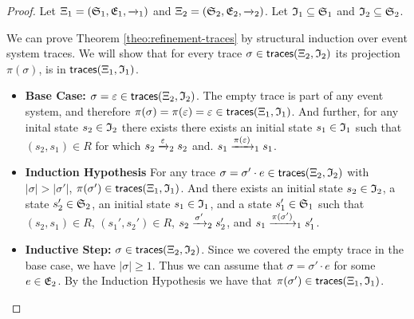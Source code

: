 \begin{proof}
    \label{proof:refinement-traces}
    Let $\EventSystem_1 = (\Statespace_1, \Eventspace_1, \Transitionrelation{1}{})$ and
    $\EventSystem_2 = (\Statespace_2, \Eventspace_2, \Transitionrelation{2}{})$.
    Let $\Initialstates_1 \subseteq \Statespace_1$ and
    $\Initialstates_2 \subseteq \Statespace_2$.

    We can prove Theorem \ref{theo:refinement-traces} by
    structural induction over event system traces.
    We will show that for every trace
    $\sigma \in \EStraces(\EventSystem_2, \Initialstates_2)$
    its projection $\pi(\sigma)$, is in
    $\EStraces(\EventSystem_1, \Initialstates_1)$.
    \begin{itemize}
        \item \textbf{Base Case:}
            $\sigma = \emptytrace \in
            \EStraces(\EventSystem_2, \Initialstates_2)$.
            The empty trace is part of any event system,
            and therefore
            $\pi(\sigma) = \pi(\emptytrace) = \emptytrace 
            \in \EStraces(\EventSystem_1, \Initialstates_1)$.
            And further, for any inital state $s_2 \in \Initialstates_2$ there exists
            there exists an initial state $s_1 \in \Initialstates_1$ such that
            $(s_2, s_1) \in R$
            for which $s_2 \Transitionrelation{2}{\emptytrace} s_2$ and.
            $s_1 \Transitionrelation{1}{\pi(\emptytrace)} s_1$.
        \item \textbf{Induction Hypothesis}
            For any trace
            $\sigma = \sigma' \cdot e
            \in \EStraces(\EventSystem_2, \Initialstates_2)$ with
            $|\sigma| > |\sigma'|$,
            $\pi(\sigma') \in \EStraces(\EventSystem_1, \Initialstates_1)$.
            And there exists an initial state $s_2 \in \Initialstates_2$,
            a state $s_2' \in \Statespace_2$, an initial state
            $s_1 \in \Initialstates_1$, and a state $s_1' \in \Statespace_1$
            such that $(s_2, s_1) \in R$, $(s_1', s_2') \in R$,
            $s_2 \Transitionrelation{2}{\sigma'} s_2'$, and
            $s_1 \Transitionrelation{1}{\pi(\sigma')} s_1'$.
        \item \textbf{Inductive Step:}
            $\sigma \in \EStraces(\EventSystem_2, \Initialstates_2)$.
            Since we covered the empty trace in the base case,
            we have $|\sigma| \geq 1$.
            Thus we can assume that $\sigma = \sigma' \cdot e$ for some
            $e \in \Eventspace_2$.
            By the Induction Hypothesis we have that
            $\pi(\sigma') \in \EStraces(\EventSystem_1, \Initialstates_1)$.


\end{itemize}
\end{proof}
